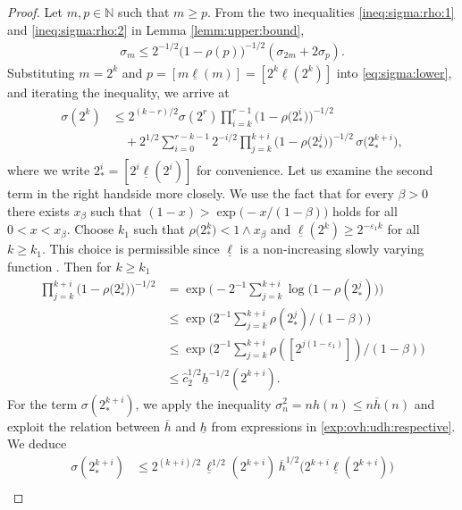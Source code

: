 \documentclass[11pt,a4,leqno]{amsart}
\newcommand{\N}{\mathbb{N}}
\newcommand{\ov}{\overline}
\newcommand{\ud}{\underline}
\newcommand{\wh}{\widehat}
\newcommand{\vep}{\varepsilon}
\newcommand{\1}{{\mathbf 1}}
\begin{document}
\begin{proof}
Let $m,p \in \N$ such that $m\ge p$. 
 From the two inequalities \eqref{ineq:sigma:rho:1} and \eqref{ineq:sigma:rho:2} in Lemma \ref{lemm:upper:bound}, 
\begin{align}
\label{eq:sigma:lower}
 \sigma_m \le 2^{-1/2} \big(1-\rho (p)\big)^{-1/2} (\sigma_{2m}+ 2\sigma_p).
\end{align}
Substituting $m=2^k$ and $p= [m \ud \ell (m)]=[2^k \ud \ell (2^k)]$ into \eqref{eq:sigma:lower}, 
and iterating the inequality, we arrive at  
\begin{align}
\begin{split}
\label{eq:sigma:lower:recussion}
 \sigma(2^k) &\le 2^{(k-r)/2} \sigma(2^r) \prod_{i=k}^{r-1} \big(
1-\rho \big( 2^i_\ast \big)
\big)^{-1/2} \\
&\quad + 2^{1/2}\sum_{i=0}^{r-k-1} 2^{-i/2} \prod_{j=k}^{k+i} \big(
1-\rho \big( 2^{j}_\ast \big)
\big)^{-1/2}\,\sigma\big( 2^{k+i}_\ast \big),
\end{split}
\end{align}
where we write $2^i_\ast = [ 2^i \ud \ell (2^i)]$ for convenience. 
Let us examine the second term in the right handside more closely. We use the fact that for every 
$\beta>0$ there exists $x_\beta$ such that $(1-x)> \exp\big(-x/(1-\beta)\big)$ holds for all 
$0<x<x_\beta$. 
Choose $k_1$ such that $\rho\big(2^{k}_\ast \big)<1 \wedge x_\beta$ and 
$\ud \ell(2^k) \ge 2^{-\vep_1 k}$ for all $k\ge k_1$. This choice is permissible 
since $\ud \ell$ is a non-increasing slowly varying function \cite[Proposition 1.3.6 (v)]{bingham:goldie:teugels:1987}. 
Then for $k\ge k_1$ 
\begin{align*}
 \prod_{j=k}^{k+i} \big(
1-\rho \big(2^{j}_\ast \big) \big)^{-1/2} 
&= \exp \Big(-2^{-1} \sum_{j=k}^{k+i} \log \big(1-\rho (2^{j}_\ast) \big) \Big) \\
&\le \exp \bigg( 2^{-1} \sum_{j=k}^{k+i} \rho (2^{j}_\ast )/(1-\beta) \bigg) \\
&\le \exp \bigg( 2^{-1} \sum_{j=k}^{k+i} \rho ([2^{j(1-\vep_1)}] )/(1-\beta) \bigg) \\
&\le \wh c_2^{1/2} \ud h^{-1/2}(2^{k+i}). 
\end{align*}
For the term $\sigma(2_\ast^{k+i})$, we apply the inequality $\sigma_n^2 = nh(n) \le n\ov h(n)$ and 
exploit the relation between $\ov h$ and $\ud h$ from expressions in \eqref{exp:ovh:udh:respective}.
We deduce 
\begin{align*}
 \sigma(2^{k+i}_\ast) &\le 2^{(k+i)/2}\, \ud \ell^{1/2}(2^{k+i})\, \ov h^{1/2}\big(2^{k+i}\ud \ell(2^{k+i}) \big) \\

\end{align*}
\end{proof}
\end{document}
